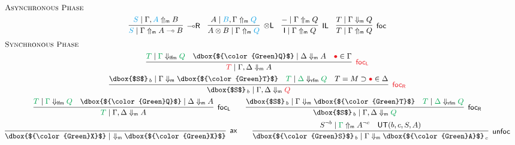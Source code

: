\documentclass[runningheads]{llncs}
\newcommand{\tl}{\otimes \mathsf{L}}
\newcommand{\lright}{{\multimap}\mathsf{R}}
\newcommand{\unitl}{\mathsf{IL}}
\newcommand{\otL}{\tl}
\newcommand{\lolliR}{\lright}
\newcommand{\IL}{\unitl}
\newcommand{\ax}{\mathsf{ax}}
\newcommand{\ot}{\otimes}
\newcommand{\lolli}{\multimap}
\newcommand{\I}{\mathsf{I}}
\newcommand{\lfm}{\dn_\mathsf{lfm}}%
\newcommand{\rfm}{\dn_\mathsf{rfm}}%
\newcommand{\red}[1]{{\color{Red}#1}}
\newcommand{\blue}[1]{{\color{Cerulean}#1}}
\newcommand{\green}[1]{{\color{Green}#1}}
\newcommand{\UT}{\mathsf{UT}}
\newcommand{\dn}{\Downarrow}
\newcommand{\upm}{\Uparrow_{\mathsf{m}}}
\newcommand{\dnm}{\Downarrow_{\mathsf{m}}}
\newcommand{\focL}{\mathsf{foc_L}}
\newcommand{\foc}{\mathsf{foc}}
\newcommand{\focR}{\mathsf{foc_R}}
\newcommand{\unfoc}{\mathsf{unfoc}}
\begin{document}
\begin{figure}[t]
  \[
  \small
  \begin{array}{c}
    \multicolumn{1}{l}{\text{\textsc{Asynchronous Phase}}} \\[4pt]
      \infer[\lolliR]{\blue{S} \mid \Gamma \upm A \lolli B}{\blue{S} \mid \Gamma , \blue{A} \upm B}
    \quad
    \infer[\otL]{A \ot B \mid \Gamma \upm \blue{Q}}{A\mid  \blue{B} , \Gamma \upm \blue{Q}}
    \quad
      \infer[\IL]{\I \mid \Gamma \upm Q}{- \mid \Gamma \upm Q}    
    \quad
        \infer[\foc]{T \mid \Gamma \upm Q}{
      T \mid \Gamma \dnm Q
    }
    \\[6pt]
    \multicolumn{1}{l}{\text{\textsc{Synchronous Phase}}} \\[4pt]
        \infer[\red{\focL}]{\red{T} \mid \Gamma , \Delta \dnm A}{
          \green{T} \mid \green{\Gamma} \lfm \green{Q} &
          \dbox{$\green{Q}$} \mid \Delta \dnm A
          & \red{\bullet} \in \Gamma
        }
     \\[4pt]
    \infer[\red{\focR}]{\dbox{$S$}_{\, b} \mid \Gamma,\Delta \dnm \red{Q}}{
      \dbox{$S$}_{\, b} \mid \Gamma \dnm \dbox{$\green{T}$}
      &
      \green{T} \mid \green{\Delta} \rfm \green{Q}
      & T = M \supset \red{\bullet} \in \Delta
    }
    \\[4pt]
            \infer[\focL]{\green{T} \mid \Gamma , \Delta \dnm A}{
          \green{T} \mid \green{\Gamma} \lfm \green{Q} &
          \dbox{$\green{Q}$} \mid \Delta \dnm A
        }\qquad
\infer[\focR]{\dbox{$S$}_{\, b} \mid \Gamma,\Delta \dnm \green{Q}}{
      \dbox{$S$}_{\, b} \mid \Gamma \dnm \dbox{$\green{T}$}
      &
      \green{T} \mid \green{\Delta} \rfm \green{Q}
    }
    \\[4pt]
        \infer[\ax]{\dbox{$\green{X}$} \mid ~ \dnm \dbox{$\green{X}$}}{}
    \qquad
    \infer[\unfoc]{\dbox{$\green{S}$}_{\,b} \mid \Gamma \dnm \dbox{$\green{A}$}_{\,c}}{
      S^{\neg b} \mid \green{\Gamma} \upm A^{\neg c}
      &
      \UT(b,c,S,A)
    }

\end{array}\]
\end{figure}
\end{document}

